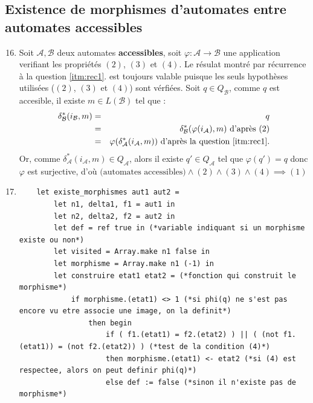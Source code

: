\documentclass{article}
\begin{document}
\subsection{Existence de morphismes d'automates entre automates accessibles}

\begin{enumerate}
    \setcounter{enumi}{15}
    
    \item \label{itm:accessible} Soit $\mathcal{A}, \mathcal{B}$ deux automates \textbf{accessibles}, soit $\varphi : \mathcal{A} \rightarrow \mathcal{B}$ une application verifiant les propriétés $(2)$, $(3)$ et $(4)$. Le résulat montré par récurrence à la question \ref{itm:rec1}. est toujours valable puisque les seuls hypothèses utilisées ($(2)$, $(3)$ et $(4)$) sont vérfiées. \newline
    Soit $q \in Q_\mathcal{B}$, comme $q$ est accesible, il existe $m \in L(\mathcal{B})$ tel que :
    \begin{eqnarray*}
        \delta^*_\mathcal{B}(i_\mathcal{B}, m) & = & q \\
        & = & \delta^*_\mathcal{B}(\varphi(i_\mathcal{A}), m) \text{ d'après $(2)$} \\
        & = & \varphi(\delta^*_\mathcal{A}(i_\mathcal{A}, m)) \text{ d'après la question \ref{itm:rec1}.}
    \end{eqnarray*}
    Or, comme $\delta^*_\mathcal{A}(i_\mathcal{A}, m) \in Q_\mathcal{A}$, alors il existe $q' \in Q_\mathcal{A}$ tel que $\varphi(q') = q$ donc $\varphi$ est surjective, d'où $\boxed{\text{(automates accessibles)} \land (2) \land (3) \land (4) \implies (1)}$
    \item  
    \begin{verbatim}
    let existe_morphismes aut1 aut2 =
        let n1, delta1, f1 = aut1 in 
        let n2, delta2, f2 = aut2 in
        let def = ref true in (*variable indiquant si un morphisme existe ou non*)
        let visited = Array.make n1 false in
        let morphisme = Array.make n1 (-1) in 
        let construire etat1 etat2 = (*fonction qui construit le morphisme*)
            if morphisme.(etat1) <> 1 (*si phi(q) ne s'est pas encore vu etre associe une image, on la definit*)
                then begin
                    if ( f1.(etat1) = f2.(etat2) ) || ( (not f1.(etat1)) = (not f2.(etat2)) ) (*test de la condition (4)*)
                    then morphisme.(etat1) <- etat2 (*si (4) est respectee, alors on peut definir phi(q)*)
                    else def := false (*sinon il n'existe pas de morphisme*)

\end{verbatim}
\end{enumerate}
\end{document}
